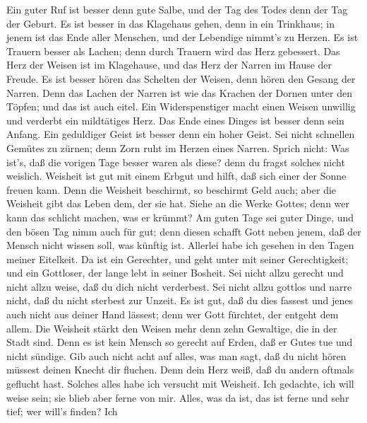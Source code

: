  Ein guter Ruf ist besser denn gute Salbe, und der Tag des
Todes denn der Tag der Geburt.  Es ist besser in das
Klagehaus gehen, denn in ein Trinkhaus; in jenem ist das Ende aller
Menschen, und der Lebendige nimmt's zu Herzen.  Es ist
Trauern besser als Lachen; denn durch Trauern wird das Herz gebessert.
 Das Herz der Weisen ist im Klagehause, und das Herz der
Narren im Hause der Freude.  Es ist besser hören das
Schelten der Weisen, denn hören den Gesang der Narren.  Denn
das Lachen der Narren ist wie das Krachen der Dornen unter den Töpfen;
und das ist auch eitel.  Ein Widerspenstiger macht einen
Weisen unwillig und verderbt ein mildtätiges Herz.  Das Ende
eines Dinges ist besser denn sein Anfang. Ein geduldiger Geist ist
besser denn ein hoher Geist.  Sei nicht schnellen Gemütes zu
zürnen; denn Zorn ruht im Herzen eines Narren.  Sprich
nicht: Was ist's, daß die vorigen Tage besser waren als diese? denn du
fragst solches nicht weislich.  Weisheit ist gut mit einem
Erbgut und hilft, daß sich einer der Sonne freuen kann. 
Denn die Weisheit beschirmt, so beschirmt Geld auch; aber die Weisheit
gibt das Leben dem, der sie hat.  Siehe an die Werke
Gottes; denn wer kann das schlicht machen, was er krümmt? 
Am guten Tage sei guter Dinge, und den bösen Tag nimm auch für gut; denn
diesen schafft Gott neben jenem, daß der Mensch nicht wissen soll, was
künftig ist.  Allerlei habe ich gesehen in den Tagen meiner
Eitelkeit. Da ist ein Gerechter, und geht unter mit seiner
Gerechtigkeit; und ein Gottloser, der lange lebt in seiner Bosheit.
 Sei nicht allzu gerecht und nicht allzu weise, daß du dich
nicht verderbest.  Sei nicht allzu gottlos und narre nicht,
daß du nicht sterbest zur Unzeit.  Es ist gut, daß du dies
fassest und jenes auch nicht aus deiner Hand lässest; denn wer Gott
fürchtet, der entgeht dem allem.  Die Weisheit stärkt den
Weisen mehr denn zehn Gewaltige, die in der Stadt sind. 
Denn es ist kein Mensch so gerecht auf Erden, daß er Gutes tue und nicht
sündige.  Gib auch nicht acht auf alles, was man sagt, daß
du nicht hören müssest deinen Knecht dir fluchen.  Denn
dein Herz weiß, daß du andern oftmals geflucht hast. 
Solches alles habe ich versucht mit Weisheit. Ich gedachte, ich will
weise sein; sie blieb aber ferne von mir.  Alles, was da
ist, das ist ferne und sehr tief; wer will's finden?  Ich
